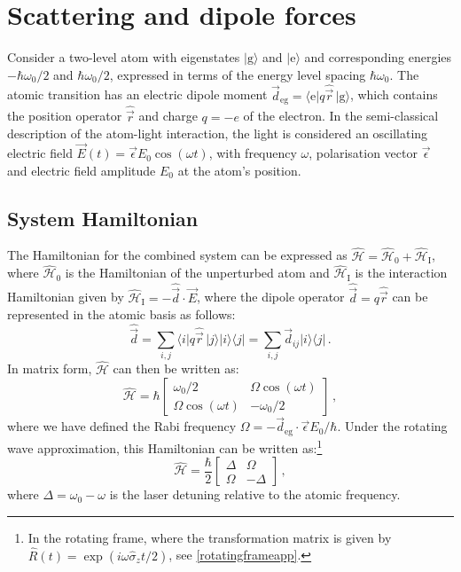 \documentclass[../Thesis-IJspeert.tex]{subfiles}
\begin{document}
\section[Scattering and dipole forces]{Scattering and dipole forces}
\label{subsection_System_Hamiltonian}
Consider a two-level atom with eigenstates $\vert \mathrm{g} \rangle$ and $\vert \mathrm{e} \rangle$ and corresponding energies $-\hbar\omega_0/2$ and $\hbar\omega_0/2$, expressed in terms of the energy level spacing $\hbar\omega_0$. The atomic transition has an electric dipole moment $\vec{d}_\mathrm{eg}=\langle \mathrm{e} \vert q \hat{\vec{r}} \,\vert \mathrm{g} \rangle$, which contains the position operator $\hat{\vec{r}}$ and charge $q=-e$ of the electron. In the semi-classical description of the atom-light interaction, the light is considered an oscillating electric field $\vec{E}(t)=\vec{\epsilon}E_0\cos \left(\omega t\right)$, with frequency $\omega$, polarisation vector $\vec{\epsilon}$ and electric field amplitude $E_0$ at the atom's position.
\subsection{System Hamiltonian}
\label{systemhamiltonian}
The Hamiltonian for the combined system can be expressed as $\hat{\mathcal{H}}=\hat{\mathcal{H}}_0+\hat{\mathcal{H}}_\mathrm{I}$, where $\hat{\mathcal{H}}_0$ is the Hamiltonian of the unperturbed atom and $\hat{\mathcal{H}}_\mathrm{I}$ is the interaction Hamiltonian given by $\hat{\mathcal{H}}_\mathrm{I}=-\hat{\vec{d}}\cdot \vec{E}$, where the dipole operator $\hat{\vec{d}}=q\hat{\vec{r}}$ can be represented in the atomic basis as follows:
\begin{equation}
\hat{\vec{d}}=\sum_{i,j} \langle i \vert q \hat{\vec{r}}\, \vert j \rangle \vert i \rangle \langle j \vert  = \sum_{i,j} \vec{d}_{ij} \vert  i \rangle \langle j \vert\,.
\end{equation}
In matrix form, $\hat{\mathcal{H}}$ can then be written as:
\begin{equation}
\label{hamiltonian1}
\hat{\mathcal{H}}=\hbar
\begin{bmatrix} 
\omega_0/2 & \Omega\cos(\omega t)\\
\Omega\cos(\omega t) & -\omega_0/2
\end{bmatrix}
\,,
\end{equation}
where we have defined the Rabi frequency $\Omega=-\vec{d}_\mathrm{eg}\cdot\vec{\epsilon}E_0/\hbar$. Under the rotating wave approximation, this Hamiltonian can be written as:\footnote{In the rotating frame, where the transformation matrix is given by $\hat{R}(t)=\exp(i\omega\hat{\sigma}_z t/2)$, see \autoref{rotatingframeapp}.}
\begin{equation}
\label{timeindependentH}
\hat{\mathcal{H}}=\frac{\hbar}{2}
\begin{bmatrix} 
\Delta& \Omega\\
\Omega& -\Delta
\end{bmatrix}\,,
\end{equation}
where $\Delta=\omega_0-\omega$ is the laser detuning relative to the atomic frequency.
\end{document}
